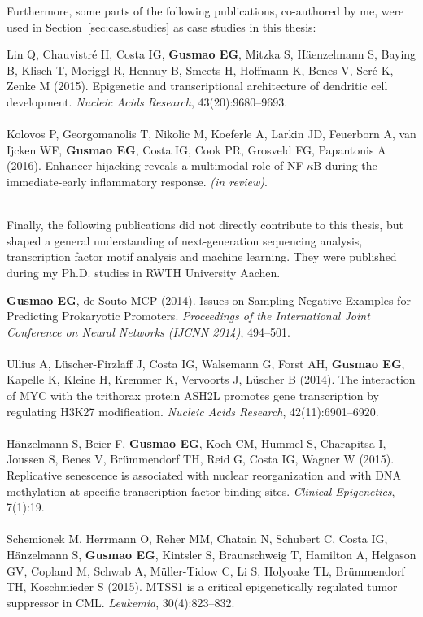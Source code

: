 Furthermore, some parts of the following publications, co-authored by me, were used in Section~\ref{sec:case.studies} as case studies in this thesis:
\\
\begin{addmargin}{0.05\textwidth}
\noindent
Lin Q, Chauvistr\'{e} H, Costa IG, \textbf{Gusmao EG}, Mitzka S, H\"{a}enzelmann S, Baying B, Klisch T, Moriggl R, Hennuy B, Smeets H, Hoffmann K, Benes V, Ser\'{e} K, Zenke M (2015). Epigenetic and transcriptional architecture of dendritic cell development. \textit{Nucleic Acids Research}, 43(20):9680--9693.\\ \\
\noindent
Kolovos P, Georgomanolis T, Nikolic M, Koeferle A, Larkin JD, Feuerborn A, van Ijcken WF, \textbf{Gusmao EG}, Costa IG, Cook PR, Grosveld FG, Papantonis A (2016). Enhancer hijacking reveals a multimodal role of NF-$\kappa$B during the immediate-early inflammatory response. \textit{(in review)}.\\ \\

\end{addmargin} 

Finally, the following publications did not directly contribute to this thesis, but shaped a general understanding of next-generation sequencing analysis, transcription factor motif analysis and machine learning. They were published during my Ph.D. studies in RWTH University Aachen.
\\
\begin{addmargin}{0.05\textwidth}
\noindent
\textbf{Gusmao EG}, de Souto MCP (2014). Issues on Sampling Negative Examples for Predicting Prokaryotic Promoters. \textit{Proceedings of the International Joint Conference on Neural Networks (IJCNN 2014)}, 494--501. \\ \\
\noindent
Ullius A, L\"{u}scher-Firzlaff J, Costa IG, Walsemann G, Forst AH, \textbf{Gusmao EG}, Kapelle K, Kleine H, Kremmer K, Vervoorts J, L\"{u}scher B (2014). The interaction of MYC with the trithorax protein ASH2L promotes gene transcription by regulating H3K27 modification. \textit{Nucleic Acids Research}, 42(11):6901--6920. \\ \\
\noindent
H\"{a}nzelmann S, Beier F, \textbf{Gusmao EG}, Koch CM, Hummel S, Charapitsa I, Joussen S, Benes V, Br\"{u}mmendorf TH, Reid G, Costa IG, Wagner W (2015). Replicative senescence is associated with nuclear reorganization and with DNA methylation at specific transcription factor binding sites. \textit{Clinical Epigenetics}, 7(1):19. \\ \\
\noindent
Schemionek M, Herrmann O, Reher MM, Chatain N, Schubert C, Costa IG, \linebreak H\"{a}nzelmann S, \textbf{Gusmao EG}, Kintsler S, Braunschweig T, Hamilton A, Helgason GV, Copland M, Schwab A, M\"{u}ller-Tidow C, Li S, Holyoake TL, Br\"{u}mmendorf TH, \linebreak Koschmieder S (2015). MTSS1 is a critical epigenetically regulated tumor suppressor in CML. \textit{Leukemia}, 30(4):823--832. \\
\end{addmargin}

